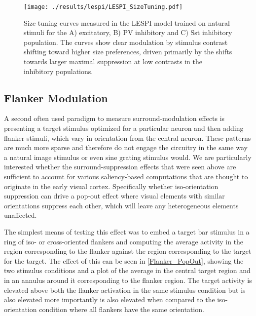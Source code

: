 \begin{figure}
	\centering
        \texttt{[image: ./results/lespi/LESPI\_SizeTuning.pdf]}
	\caption[Size tuning curves of the excitatory, PV and Sst
      population at various contrasts.]{Size tuning curves measured in
      the LESPI model trained on natural stimuli for the A)
      excitatory, B) PV inhibitory and C) Sst inhibitory
      population. The curves show clear modulation by stimulus
      contrast shifting toward higher size preferences, driven
      primarily by the shifts towards larger maximal suppression at
      low contrasts in the inhibitory populations.}
	\label{LESPI_SizeTuning}
\end{figure}

\subsection{Flanker Modulation}

A second often used paradigm to measure surround-modulation effects is
presenting a target stimulus optimized for a particular neuron and
then adding flanker stimuli, which vary in orientation from the
central neuron. These patterns are much more sparse and therefore do
not engage the circuitry in the same way a natural image stimulus or
even sine grating stimulus would. We are particularly interested
whether the surround-suppression effects that were seen above are
sufficient to account for various saliency-based computations that are
thought to originate in the early visual cortex. Specifically whether
iso-orientation suppression can drive a pop-out effect where visual
elements with similar orientations suppress each other, which will
leave any heterogeneous elements unaffected.

The simplest means of testing this effect was to embed a target bar
stimulus in a ring of iso- or cross-oriented flankers and computing
the average activity in the region corresponding to the flanker
against the region corresponding to the target for the target. The
effect of this can be seen in \ref{Flanker_PopOut}, showing the two
stimulus conditions and a plot of the average in the central target
region and in an annulus around it corresponding to the flanker
region. The target activity is elevated above both the flanker
activation in the same stimulus condition but is also elevated more
importantly is also elevated when compared to the iso-orientation
condition where all flankers have the same orientation.

